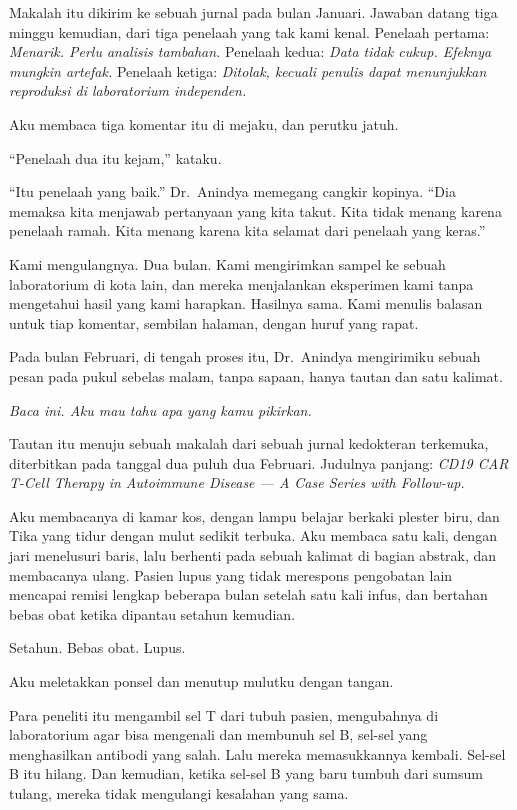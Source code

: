 \documentclass[11pt,twoside,openany]{book}
\makeatletter
\newcommand{\scenebreak}{\par\vspace{0.9em}{\centering\textsc{*\hspace{0.7em}*\hspace{0.7em}*}\par}\vspace{0.9em}\@afterindentfalse\@afterheading}
\makeatother
\begin{document}
Makalah itu dikirim ke sebuah jurnal pada bulan Januari. Jawaban datang tiga minggu kemudian, dari tiga penelaah yang tak kami kenal. Penelaah pertama: \emph{Menarik. Perlu analisis tambahan.} Penelaah kedua: \emph{Data tidak cukup. Efeknya mungkin artefak.} Penelaah ketiga: \emph{Ditolak, kecuali penulis dapat menunjukkan reproduksi di laboratorium independen.}

Aku membaca tiga komentar itu di mejaku, dan perutku jatuh.

``Penelaah dua itu kejam,'' kataku.

``Itu penelaah yang baik.'' Dr.~Anindya memegang cangkir kopinya. ``Dia memaksa kita menjawab pertanyaan yang kita takut. Kita tidak menang karena penelaah ramah. Kita menang karena kita selamat dari penelaah yang keras.''

Kami mengulangnya. Dua bulan. Kami mengirimkan sampel ke sebuah laboratorium di kota lain, dan mereka menjalankan eksperimen kami tanpa mengetahui hasil yang kami harapkan. Hasilnya sama. Kami menulis balasan untuk tiap komentar, sembilan halaman, dengan huruf yang rapat.

\scenebreak
Pada bulan Februari, di tengah proses itu, Dr.~Anindya mengirimiku sebuah pesan pada pukul sebelas malam, tanpa sapaan, hanya tautan dan satu kalimat.

\emph{Baca ini. Aku mau tahu apa yang kamu pikirkan.}

Tautan itu menuju sebuah makalah dari sebuah jurnal kedokteran terkemuka, diterbitkan pada tanggal dua puluh dua Februari. Judulnya panjang: \emph{CD19 CAR T-Cell Therapy in Autoimmune Disease --- A Case Series with Follow-up.}

Aku membacanya di kamar kos, dengan lampu belajar berkaki plester biru, dan Tika yang tidur dengan mulut sedikit terbuka. Aku membaca satu kali, dengan jari menelusuri baris, lalu berhenti pada sebuah kalimat di bagian abstrak, dan membacanya ulang. Pasien lupus yang tidak merespons pengobatan lain mencapai remisi lengkap beberapa bulan setelah satu kali infus, dan bertahan bebas obat ketika dipantau setahun kemudian.

Setahun. Bebas obat. Lupus.

Aku meletakkan ponsel dan menutup mulutku dengan tangan.

Para peneliti itu mengambil sel T dari tubuh pasien, mengubahnya di laboratorium agar bisa mengenali dan membunuh sel B, sel-sel yang menghasilkan antibodi yang salah. Lalu mereka memasukkannya kembali. Sel-sel B itu hilang. Dan kemudian, ketika sel-sel B yang baru tumbuh dari sumsum tulang, mereka tidak mengulangi kesalahan yang sama.
\end{document}

